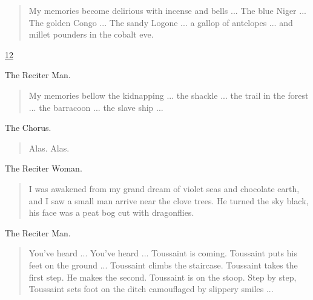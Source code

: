 \documentclass[letterpaper,article,12pt,oneside,notitlepage]{memoir}
\begin{document}
\begin{verse}
\indent My memories become delirious with incense and bells ... The blue Niger ... The golden Congo ... The sandy Logone ... a gallop of antelopes ... and millet pounders in the cobalt eve. \\
\end{verse}

\clearpage

\href{http://cesaire.elotroalex.com/chiens/chiens/p012.html}{12}

\begin{center}The Reciter Man.\end{center}

\begin{verse}
\indent My memories bellow the kidnapping ... the shackle ... the trail in the forest ... the barracoon ... the slave ship ... \\
\end{verse}

\begin{center}The Chorus.\end{center}

\begin{verse}
\hspace{1cm} Alas. Alas. \\
\end{verse}

\begin{center}The Reciter Woman.\end{center}

\begin{verse}
\indent I was awakened from my grand dream of violet seas and chocolate earth, and I saw a small man arrive near the clove trees. He turned the sky black, his face was a peat bog cut with dragonflies. \\
\end{verse}

\begin{center}The Reciter Man.\end{center}

\begin{verse}
\indent You've heard ... You've heard ... Toussaint is coming. Toussaint puts his feet on the ground ... Toussaint climbs the staircase. Toussaint takes the first step. He makes the second. Toussaint is on the stoop. Step by step, Toussaint sets foot on the ditch camouflaged by slippery smiles ... \\
\end{verse}
\end{document}
